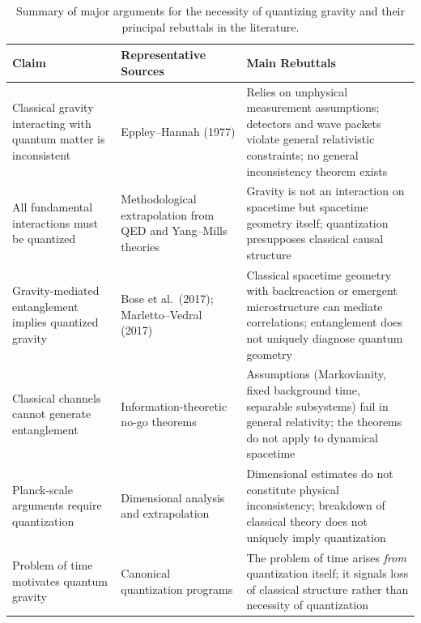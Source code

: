 \documentclass[12pt]{article}
\begin{document}
\begin{table}[h]
\centering
\renewcommand{\arraystretch}{1.25}
\begin{tabular}{|p{3.5cm}|p{5.5cm}|p{5.5cm}|}
\hline
\textbf{Claim} & \textbf{Representative Sources} & \textbf{Main Rebuttals} \\
\hline

Classical gravity interacting with quantum matter is inconsistent &
Eppley--Hannah (1977) \cite{EppleyHannah1977} &
Relies on unphysical measurement assumptions; detectors and wave packets
    violate general relativistic constraints; no general inconsistency theorem
    exists \cite{Mattingly2006, HuggettCallender2001} \\
\hline
All fundamental interactions must be quantized &
Methodological extrapolation from QED and Yang--Mills theories &
Gravity is not an interaction on spacetime but spacetime geometry itself;
    quantization presupposes classical causal structure
    \cite{HuggettCallender2001} \\
\hline
Gravity-mediated entanglement implies quantized gravity &
Bose et al.\ (2017); Marletto--Vedral (2017) \cite{Bose2017, MarlettoVedral2017} &
Classical spacetime geometry with backreaction or emergent microstructure can
    mediate correlations; entanglement does not uniquely diagnose quantum
    geometry \cite{HallReginatto2018, AnastopoulosHu2018} \\
\hline
Classical channels cannot generate entanglement &
Information-theoretic no-go theorems &
Assumptions (Markovianity, fixed background time, separable subsystems) fail in
    general relativity; the theorems do not apply to dynamical spacetime
    \cite{HallReginatto2018} \\
\hline
Planck-scale arguments require quantization &
Dimensional analysis and extrapolation &
Dimensional estimates do not constitute physical inconsistency; breakdown of classical theory does not uniquely imply quantization \cite{HuggettCallender2001} \\
\hline
Problem of time motivates quantum gravity &
Canonical quantization programs &
The problem of time arises \emph{from} quantization itself; it signals loss of
    classical structure rather than necessity of quantization \\
\hline
\end{tabular}
\caption{Summary of major arguments for the necessity of quantizing gravity and their principal rebuttals in the literature.}
\label{tab:claims_rebuttals}
\end{table}
\end{document}
